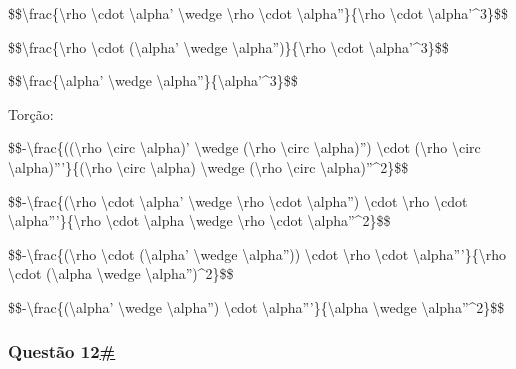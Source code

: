 \$\$\textbackslash{}frac\{\textbar{}\textbackslash{}rho
\textbackslash{}cdot \textbackslash{}alpha' \textbackslash{}wedge
\textbackslash{}rho \textbackslash{}cdot
\textbackslash{}alpha''\textbar{}\}\{\textbar{}\textbackslash{}rho
\textbackslash{}cdot \textbackslash{}alpha'\textbar{}\^{}3\}\$\$

\$\$\textbackslash{}frac\{\textbar{}\textbackslash{}rho
\textbackslash{}cdot (\textbackslash{}alpha' \textbackslash{}wedge
\textbackslash{}alpha'')\textbar{}\}\{\textbar{}\textbackslash{}rho
\textbackslash{}cdot \textbackslash{}alpha'\textbar{}\^{}3\}\$\$

\$\$\textbackslash{}frac\{\textbar{}\textbackslash{}alpha'
\textbackslash{}wedge
\textbackslash{}alpha''\textbar{}\}\{\textbar{}\textbackslash{}alpha'\textbar{}\^{}3\}\$\$

Torção:

\$\$-\textbackslash{}frac\{((\textbackslash{}rho \textbackslash{}circ
\textbackslash{}alpha)' \textbackslash{}wedge (\textbackslash{}rho
\textbackslash{}circ \textbackslash{}alpha)'') \textbackslash{}cdot
(\textbackslash{}rho \textbackslash{}circ
\textbackslash{}alpha)'''\}\{\textbar{}(\textbackslash{}rho
\textbackslash{}circ \textbackslash{}alpha) \textbackslash{}wedge
(\textbackslash{}rho \textbackslash{}circ
\textbackslash{}alpha)''\textbar{}\^{}2\}\$\$

\$\$-\textbackslash{}frac\{(\textbackslash{}rho \textbackslash{}cdot
\textbackslash{}alpha' \textbackslash{}wedge \textbackslash{}rho
\textbackslash{}cdot \textbackslash{}alpha'') \textbackslash{}cdot
\textbackslash{}rho \textbackslash{}cdot
\textbackslash{}alpha'''\}\{\textbar{}\textbackslash{}rho
\textbackslash{}cdot \textbackslash{}alpha \textbackslash{}wedge
\textbackslash{}rho \textbackslash{}cdot
\textbackslash{}alpha''\textbar{}\^{}2\}\$\$

\$\$-\textbackslash{}frac\{(\textbackslash{}rho \textbackslash{}cdot
(\textbackslash{}alpha' \textbackslash{}wedge \textbackslash{}alpha''))
\textbackslash{}cdot \textbackslash{}rho \textbackslash{}cdot
\textbackslash{}alpha'''\}\{\textbar{}\textbackslash{}rho
\textbackslash{}cdot (\textbackslash{}alpha \textbackslash{}wedge
\textbackslash{}alpha'')\textbar{}\^{}2\}\$\$

\$\$-\textbackslash{}frac\{(\textbackslash{}alpha' \textbackslash{}wedge
\textbackslash{}alpha'') \textbackslash{}cdot
\textbackslash{}alpha'''\}\{\textbar{}\textbackslash{}alpha
\textbackslash{}wedge \textbackslash{}alpha''\textbar{}\^{}2\}\$\$

\hypertarget{questuxe3o-12}{%
\subsubsection{\texorpdfstring{Questão
12\protect\hyperlink{questuxe3o-12}{\#}}{Questão 12\#}}\label{questuxe3o-12}}

